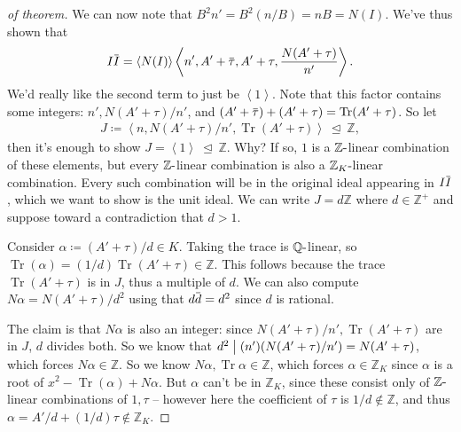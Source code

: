 \begin{proof}[of theorem]
We can now note that \(B^2 n' = B^2(n/B) = nB = N(I)\). We've thus shown
that
\begin{align*}
I \mkern 1.5mu\overline{\mkern-1.5muI\mkern-1.5mu}\mkern 1.5mu 
= \left\langle{ N(I) }\right\rangle 
\left\langle{ n', A' + \mkern 1.5mu\overline{\mkern-1.5mu \tau\mkern-1.5mu}\mkern 1.5mu , A' + \tau, { N(A' + \tau) \over  n'} }\right\rangle   
.\end{align*}
We'd really like the second term to just be
\(\left\langle{ 1 }\right\rangle\). Note that this factor contains some
integers: \(n', N(A' + \tau)/n'\), and
\((A' + \mkern 1.5mu\overline{\mkern-1.5mu\tau\mkern-1.5mu}\mkern 1.5mu) + (A' + \tau) = \operatorname{Tr}(A' + \tau)\).
So let
\begin{align*}
J \coloneqq\left\langle{ n, N(A' + \tau)/n', \operatorname{Tr}(A' + \tau) }\right\rangle {~\trianglelefteq~}{\mathbb{Z}}
,\end{align*}
then it's enough to show
\(J = \left\langle{ 1 }\right\rangle {~\trianglelefteq~}{\mathbb{Z}}\).
Why? If so, \(1\) is a \({\mathbb{Z}}{\hbox{-}}\)linear combination of
these elements, but every \({\mathbb{Z}}{\hbox{-}}\)linear combination
is also a \({\mathbb{Z}}_K{\hbox{-}}\)linear combination. Every such
combination will be in the original ideal appearing in
\(I \mkern 1.5mu\overline{\mkern-1.5muI\mkern-1.5mu}\mkern 1.5mu\),
which we want to show is the unit ideal. We can write
\(J = d{\mathbb{Z}}\) where \(d\in {\mathbb{Z}}^+\) and suppose toward a
contradiction that \(d>1\).

\hfill\break

Consider \(\alpha \coloneqq(A' + \tau) / d \in K\). Taking the trace is
\({\mathbb{Q}}{\hbox{-}}\)linear, so
\(\operatorname{Tr}( \alpha) = (1/d) \operatorname{Tr}(A' + \tau) \in {\mathbb{Z}}\).
This follows because the trace \(\operatorname{Tr}(A' + \tau)\) is in
\(J\), thus a multiple of \(d\). We can also compute
\(N \alpha = N(A' + \tau) / d^2\) using that
\(d\mkern 1.5mu\overline{\mkern-1.5mud\mkern-1.5mu}\mkern 1.5mu = d^2\)
since \(d\) is rational.

\hfill\break

The claim is that \(N \alpha\) is also an integer: since
\(N(A' + \tau)/n', \operatorname{Tr}(A' + \tau)\) are in \(J\), \(d\)
divides both. So we know that
\(d^2 \bigm|(n') (N(A' + \tau) / n') = N(A' + \tau)\), which forces
\(N \alpha\in {\mathbb{Z}}\). So we know
\(N \alpha, \operatorname{Tr}\alpha \in {\mathbb{Z}}\), which forces
\(\alpha\in {\mathbb{Z}}_K\) since \(\alpha\) is a root of
\(x^2 - \operatorname{Tr}(\alpha) + N \alpha\). But \(\alpha\) can't be
in \({\mathbb{Z}}_K\), since these consist only of
\({\mathbb{Z}}{\hbox{-}}\)linear combinations of \(1, \tau\) -- however
here the coefficient of \(\tau\) is \(1/d \not \in {\mathbb{Z}}\), and
thus \(\alpha = A'/d + (1/d) \tau \not\in {\mathbb{Z}}_K\).

\end{proof}

